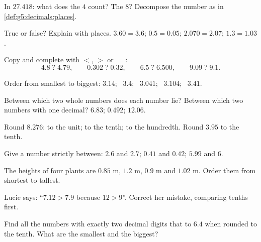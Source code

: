 \begin{exercise}[$\star$]\label{exo:g5:decimals:2}
In $27.418$: what does the $4$ count? The $8$? Decompose the number
as in \cref{def:g5:decimals:places}.
\end{exercise}

\begin{exercise}[$\star$]\label{exo:g5:decimals:3}
True or false? Explain with places.
$3.60 = 3.6$; \quad $0.5 = 0.05$; \quad $2.070 = 2.07$; \quad
$1.3 = 1.03$.
\end{exercise}

\begin{exercise}[$\star$]\label{exo:g5:decimals:4}
Copy and complete with $<$, $>$ or $=$:
\[
4.8 \;?\; 4.79, \qquad
0.302 \;?\; 0.32, \qquad
6.5 \;?\; 6.500, \qquad
9.09 \;?\; 9.1 .
\]
\end{exercise}

\begin{exercise}[$\star$]\label{exo:g5:decimals:5}
Order from smallest to biggest: $3.14$; \ $3.4$; \ $3.041$; \
$3.104$; \ $3.41$.
\end{exercise}

\begin{exercise}[$\star$]\label{exo:g5:decimals:6}
Between which two whole numbers does each number lie? Between which
two numbers with one decimal? \quad $6.83$; \quad $0.492$; \quad
$12.06$.
\end{exercise}

\begin{exercise}[$\star$]\label{exo:g5:decimals:7}
Round $8.276$: to the unit; to the tenth; to the hundredth. Round
$3.95$ to the tenth.
\end{exercise}

\begin{exercise}[$\star$]\label{exo:g5:decimals:8}
Give a number strictly between: $2.6$ and $2.7$; \quad $0.41$ and
$0.42$; \quad $5.99$ and $6$.
\end{exercise}

\begin{exercise}[$\star$]\label{exo:g5:decimals:9}
The heights of four plants are $0.85$ m, $1.2$ m, $0.9$ m and
$1.02$ m. Order them from shortest to tallest.
\end{exercise}

\begin{exercise}[$\star\star$]\label{exo:g5:decimals:10}
Lucie says: ``$7.12 > 7.9$ because $12 > 9$''. Correct her mistake,
comparing tenths first.
\end{exercise}

\begin{exercise}[$\star\star$]\label{exo:g5:decimals:11}
Find all the numbers with exactly two decimal digits that  to
$6.4$ when rounded to the tenth. What are the smallest and the
biggest?
\end{exercise}
